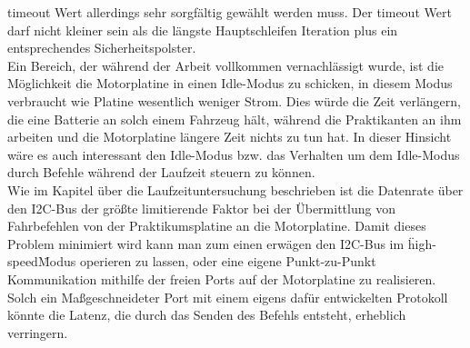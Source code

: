 timeout Wert allerdings sehr sorgfältig gewählt werden muss. Der timeout Wert darf nicht kleiner sein
als die längste Hauptschleifen Iteration plus ein entsprechendes Sicherheitspolster.\\
Ein Bereich, der während der Arbeit vollkommen vernachlässigt wurde, ist die Möglichkeit die
Motorplatine in einen Idle-Modus zu schicken, in diesem Modus verbraucht wie Platine wesentlich weniger
Strom. Dies würde die Zeit verlängern, die eine Batterie an solch einem Fahrzeug hält, während die
Praktikanten an ihm arbeiten und die Motorplatine längere Zeit nichts zu tun hat. In dieser Hinsicht
wäre es auch interessant den Idle-Modus bzw. das Verhalten um dem Idle-Modus durch Befehle während der
Laufzeit steuern zu können.\\
Wie im Kapitel über die Laufzeituntersuchung beschrieben ist die Datenrate über den I2C-Bus der größte
limitierende Faktor bei der Übermittlung von Fahrbefehlen von der Praktikumsplatine an die
Motorplatine. Damit dieses Problem minimiert wird kann man zum einen erwägen den I2C-Bus im \"high-speed\"
Modus operieren zu lassen, oder eine eigene Punkt-zu-Punkt Kommunikation mithilfe der freien Ports auf der
Motorplatine zu realisieren. Solch ein Maßgeschneideter Port mit einem eigens dafür entwickelten Protokoll
könnte die Latenz, die durch das Senden des Befehls entsteht, erheblich verringern.
